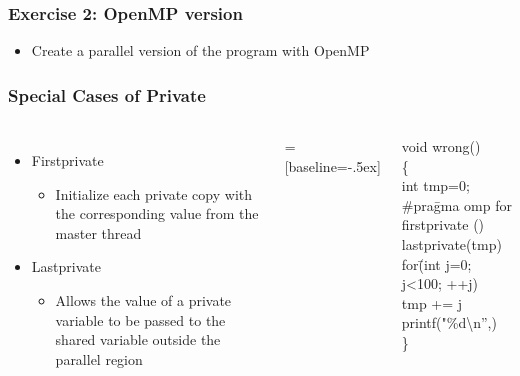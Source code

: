 \documentclass[slidestop,mathserif,compress,xcolor=svgnames]{beamer}
\newenvironment{eblock}[0]
{
\begin{beamerboxesrounded}[upper=uppercol2,lower=lowercol2,shadow=true]}
{\end{beamerboxesrounded}}
\begin{document}
\begin{frame}
  \frametitle{\small Exercise 2: OpenMP version}
  \begin{itemize}
    \item Create a parallel version of the program with OpenMP
  \end{itemize}
\end{frame}
\begin{frame}
  \frametitle{\small Special Cases of Private}
  \begin{columns}
    \column{5cm}
    \begin{itemize}
      \item Firstprivate
      \begin{itemize}
        \item Initialize each private copy with the corresponding value from the master thread
      \end{itemize}
      \item Lastprivate
      \begin{itemize}
        \item Allows the value of a private variable to be passed to the shared variable outside the parallel region
      \end{itemize}
    \end{itemize}
    \column{7cm}
     = [baseline=-.5ex]
    \begin{eblock}{}
      \begin{tabbing}
        void wrong()\\
        \{\,\,\=\\
        \> int tmp=0;\\
        \>\#pra\=gma omp for firstprivate () lastprivate(tmp)\\
        \>\>for\= (int j=0; j<100; ++j)\\
        \>\>\> tmp += j \\
        \>printf("\%d\textbackslash n'',)\\
        \}
      \end{tabbing}
    \end{eblock}
  \end{columns}
\end{frame}
\end{document}
